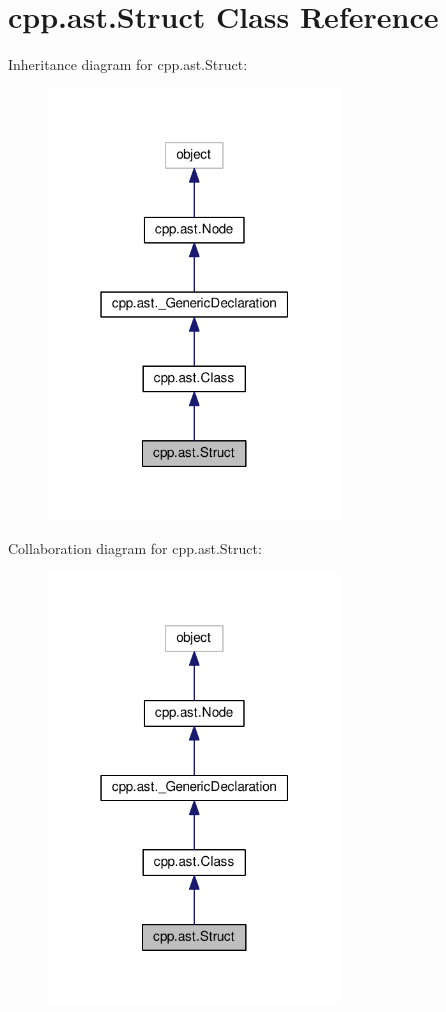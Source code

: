 \hypertarget{classcpp_1_1ast_1_1Struct}{}\section{cpp.\+ast.\+Struct Class Reference}
\label{classcpp_1_1ast_1_1Struct}


Inheritance diagram for cpp.\+ast.\+Struct\+:
\nopagebreak
\begin{figure}[H]
\begin{center}
\leavevmode
\includegraphics[width=220pt]{classcpp_1_1ast_1_1Struct__inherit__graph}
\end{center}
\end{figure}


Collaboration diagram for cpp.\+ast.\+Struct\+:
\nopagebreak
\begin{figure}[H]
\begin{center}
\leavevmode
\includegraphics[width=220pt]{classcpp_1_1ast_1_1Struct__coll__graph}
\end{center}
\end{figure}

